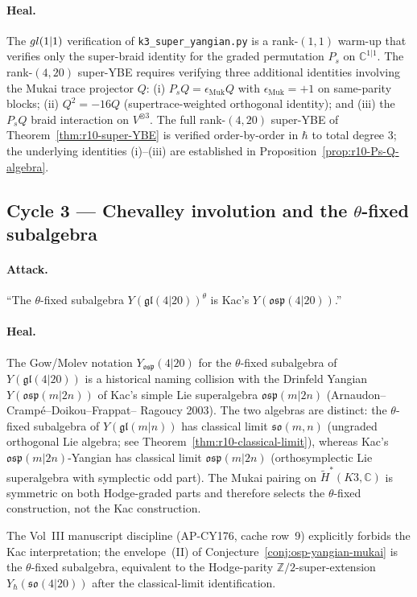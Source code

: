 \documentclass{article}
\providecommand{\C}{\mathbb C}
\providecommand{\Z}{\mathbb Z}
\providecommand{\fgl}{\mathfrak{gl}}
\providecommand{\fso}{\mathfrak{so}}
\providecommand{\fosp}{\mathfrak{osp}}
\theoremstyle{definition}
\begin{document}
\paragraph{Heal.}
The $gl(1|1)$ verification of \texttt{k3\_super\_yangian.py} is a
rank-$(1, 1)$ warm-up that verifies only the super-braid identity for
the graded permutation $P_s$ on $\C^{1|1}$. The rank-$(4, 20)$
super-YBE requires verifying three additional identities involving
the Mukai trace projector $Q$: (i) $P_s Q = \epsilon_{\mathrm{Muk}} Q$
with $\epsilon_{\mathrm{Muk}} = +1$ on same-parity blocks;
(ii) $Q^2 = -16 Q$ (supertrace-weighted orthogonal identity); and
(iii) the $P_s Q$ braid interaction on $V^{\otimes 3}$. The full
rank-$(4,20)$ super-YBE of Theorem~\ref{thm:r10-super-YBE} is
verified order-by-order in $\hbar$ to total degree $3$; the
underlying identities (i)--(iii) are established in
Proposition~\ref{prop:r10-Ps-Q-algebra}.

\subsection{Cycle 3 — Chevalley involution and the $\theta$-fixed
subalgebra}

\paragraph{Attack.}
``The $\theta$-fixed subalgebra $Y(\fgl(4|20))^\theta$ is Kac's
$Y(\fosp(4|20))$.''

\paragraph{Heal.}
The Gow/Molev notation $Y_{\fosp}(4|20)$ for the $\theta$-fixed
subalgebra of $Y(\fgl(4|20))$ is a historical naming collision with
the Drinfeld Yangian $Y(\fosp(m|2n))$ of Kac's simple Lie
superalgebra $\fosp(m|2n)$ (Arnaudon--Cramp\'e--Doikou--Frappat--
Ragoucy 2003). The two algebras are distinct: the $\theta$-fixed
subalgebra of $Y(\fgl(m|n))$ has classical limit $\fso(m, n)$
(ungraded orthogonal Lie algebra; see
Theorem~\ref{thm:r10-classical-limit}), whereas Kac's
$\fosp(m|2n)$-Yangian has classical limit $\fosp(m|2n)$ (orthosymplectic
Lie superalgebra with symplectic odd part). The Mukai pairing on
$\widetilde H^*(K3, \C)$ is symmetric on both Hodge-graded parts and
therefore selects the $\theta$-fixed construction, not the Kac
construction.

The Vol~III manuscript discipline (AP-CY176, cache row~9) explicitly
forbids the Kac interpretation; the envelope~(II) of
Conjecture~\ref{conj:osp-yangian-mukai} is the $\theta$-fixed
subalgebra, equivalent to the Hodge-parity $\Z/2$-super-extension
$Y_\hbar(\fso(4|20))$ after the classical-limit identification.
\end{document}
